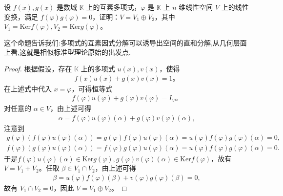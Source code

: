 \documentclass[../../main.tex]{subfiles}
\begin{document}
\begin{proposition}\label{proposition:互素多项式诱导直和分解1}
设 $f(x), g(x)$ 是数域 $\mathbb{K}$ 上的互素多项式，$\varphi$ 是 $\mathbb{K}$ 上 $n$ 维线性空间 $V$ 上的线性变换，满足 $f(\varphi)g(\varphi) = 0$，证明：$V = V_1 \oplus V_2$，其中 $V_1 = \text{Ker} f(\varphi), V_2 = \text{Ker} g(\varphi)$。
\end{proposition}
\begin{note}
这个命题告诉我们:多项式的互素因式分解可以诱导出空间的直和分解,从几何层面上看,这就是相似标准型理论原始的出发点.
\end{note}
\begin{proof}
根据假设，存在 $\mathbb{K}$ 上的多项式 $u(x), v(x)$，使得
\begin{align*}
f(x)u(x) + g(x)v(x) = 1。
\end{align*}
在上述式中代入 $x = \varphi$，可得恒等式
\begin{align*}
f(\varphi)u(\varphi) + g(\varphi)v(\varphi) = I_V。
\end{align*}
对任意的 $\alpha \in V$，由上述可得
\begin{align*}
\alpha = f(\varphi)u(\varphi)(\alpha) + g(\varphi)v(\varphi)(\alpha),
\end{align*}
注意到 
\begin{align*}
g\left( \varphi \right) \left( f\left( \varphi \right) u\left( \varphi \right) \left( \alpha \right) \right) =g\left( \varphi \right) f\left( \varphi \right) u\left( \varphi \right) \left( \alpha \right) =u\left( \varphi \right) f\left( \varphi \right) g\left( \varphi \right) \left( \alpha \right) =0,
\\
f\left( \varphi \right) \left( g\left( \varphi \right) u\left( \varphi \right) \left( \alpha \right) \right) =f\left( \varphi \right) g\left( \varphi \right) u\left( \varphi \right) \left( \alpha \right) =u\left( \varphi \right) f\left( \varphi \right) g\left( \varphi \right) \left( \alpha \right) =0.
\end{align*}
于是$f(\varphi)u(\varphi)(\alpha) \in \text{Ker} g(\varphi), g(\varphi)v(\varphi)(\alpha) \in \text{Ker} f(\varphi)$，故有 $V = V_1 + V_2$。任取 $\beta \in V_1 \cap V_2$，由上述可得
\begin{align*}
\beta = u(\varphi)f(\varphi)(\beta) + v(\varphi)g(\varphi)(\beta) = 0,
\end{align*}
故有 $V_1 \cap V_2 = 0$，因此 $V = V_1 \oplus V_2$。     

\end{proof}
\end{document}
